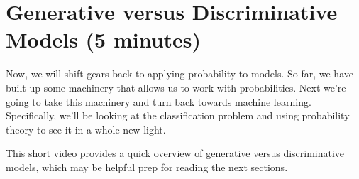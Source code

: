 \documentclass[assignment03_Solutions]{subfiles}
\begin{document}
%
%
%


\vspace{4em}

\section{Generative versus Discriminative Models (5 minutes)}
Now, we will shift gears back to applying probability to models. So far, we have built up some machinery that allows us to work with probabilities.  Next we're going to take this machinery and turn back towards machine learning.  Specifically, we'll be looking at the classification problem and using probability theory to see it in a whole new light.

\href{https://www.youtube.com/watch?v=HHNESCbZqUg}{This short video} provides a quick overview of generative versus discriminative models, which may be helpful prep for reading the next sections.
\end{document}
